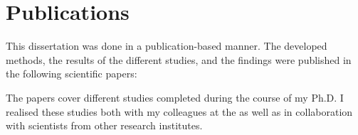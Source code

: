\chapter*{Publications}
\label{chp:Publications}

This dissertation  was done in a publication-based manner. The developed methods, the results of the different studies, and the findings were published in the following scientific papers: 


\begin{refsection}[ownpubs]
    \small
    \nocite{*} %
    \printbibliography[heading=none] 
\end{refsection}

\noindent The papers cover different studies completed during the course of my Ph.D. 
I realised these studies both with my colleagues at the \myInstitute as well as in collaboration with scientists from other research institutes.